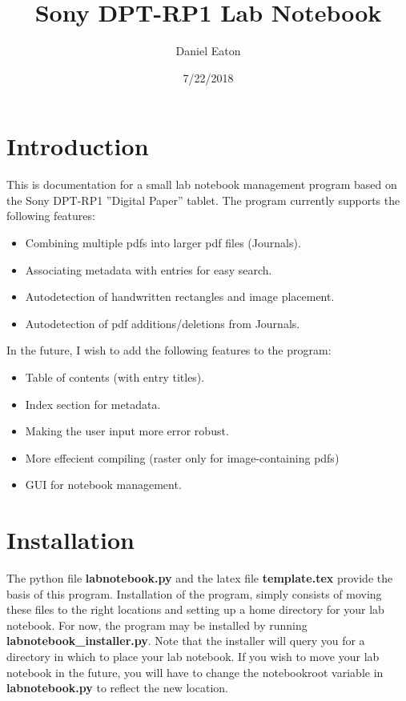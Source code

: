 \documentclass{article}
\title{Sony DPT-RP1 Lab Notebook}
\author{Daniel Eaton}
\date{7/22/2018}
\begin{document}
\maketitle

\section{Introduction}

This is documentation for a small lab notebook management program based on the Sony DPT-RP1 ''Digital Paper'' tablet. The program currently supports the following features:
\begin{itemize}
    \item Combining multiple pdfs into larger pdf files (Journals).
    \item Associating metadata with entries for easy search.
    \item Autodetection of handwritten rectangles and image placement.
    \item Autodetection of pdf additions/deletions from Journals.
\end{itemize}

\noindent In the future, I wish to add the following features to the program:
\begin{itemize}
    \item Table of contents (with entry titles).
    \item Index section for metadata.
    \item Making the user input more error robust.
    \item More effecient compiling (raster only for image-containing pdfs)
    \item GUI for notebook management.
\end{itemize}

\section{Installation}
The python file \textbf{labnotebook.py} and the latex file \textbf{template.tex} provide the basis of this program. Installation of the program, simply consists of moving these files to the right locations and setting up a home directory for your lab notebook. For now, the program may be installed by running \textbf{labnotebook\_installer.py}. Note that the installer will query you for a directory in which to place your lab notebook. If you wish to move your lab notebook in the future, you will have to change the notebookroot variable in \textbf{labnotebook.py} to reflect the new location.\\
\end{document}
